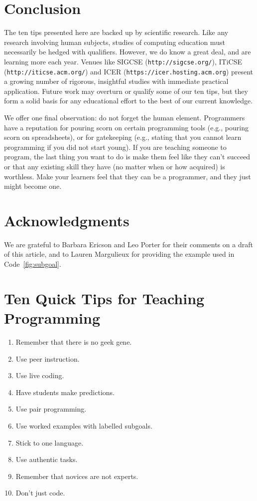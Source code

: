 \documentclass[10pt,letterpaper]{article}
\newcommand{\url}[1]{\texttt{#1}}
\begin{document}
\section*{Conclusion}

The ten tips presented here are backed up by scientific research.
Like any research involving human subjects,
studies of computing education must necessarily be hedged with qualifiers.
However,
we do know a great deal,
and are learning more each year.
Venues like SIGCSE (\url{http://sigcse.org/}), ITiCSE (\url{http://iticse.acm.org/}) and ICER (\url{https://icer.hosting.acm.org})
present a growing number of rigorous, insightful studies
with immediate practical application.
Future work may overturn or qualify some of our ten tips,
but they form a solid basis for any educational effort to the best of our current knowledge.

We offer one final observation: do not forget the human element.
Programmers have a reputation for pouring scorn on certain programming tools (e.g., pouring scorn on spreadsheets),
or for gatekeeping (e.g., stating that you cannot learn programming if you did not start young).
If you are teaching someone to program,
the last thing you want to do is make them feel like they can't succeed
or that any existing skill they have (no matter when or how acquired) is worthless.
Make your learners feel that they can be a programmer,
and they just might become one.

\section*{Acknowledgments}

We are grateful to Barbara Ericson and Leo Porter for their comments on a draft of this article,
and to Lauren Margulieux for providing the example used in Code~\ref{fig:subgoal}.

\pagebreak

\section*{Ten Quick Tips for Teaching Programming}

\begin{enumerate}
\item Remember that there is no geek gene.
\item Use peer instruction.
\item Use live coding.
\item Have students make predictions.
\item Use pair programming.
\item Use worked examples with labelled subgoals.
\item Stick to one language.
\item Use authentic tasks.
\item Remember that novices are not experts.
\item Don't just code.
\end{enumerate}
\end{document}
